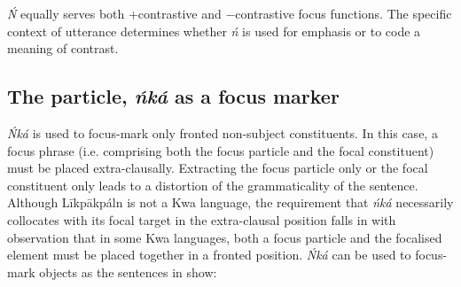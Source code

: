 \documentclass[output=paper,colorlinks,citecolor=brown]{langscibook}
\begin{document}
\ea%
    \label{ex:bisilki:12}
    \z
\z

\textit{Ń} equally serves both +contrastive and −contrastive focus functions. The specific context of utterance determines whether \textit{ń} is used for emphasis or to code a meaning of contrast.

\subsection{The particle, \textit{ńká} as a focus marker}\label{sec:bisilki:5.2}

\textit{Ńká} is used to focus-mark only fronted non-subject constituents. In this case, a focus phrase (i.e. comprising both the focus particle and the focal constituent) must be placed extra-clausally. Extracting the focus particle only or the focal constituent only leads to a distortion of the grammaticality of the sentence. Although Līkpākpáln is not a Kwa language, the requirement that \textit{ńká }necessarily collocates with its focal target in the extra-clausal position falls in with  observation that in some Kwa languages, both a focus particle and the focalised element must be placed together in a fronted position. \textit{Ńká} can be used to focus-mark objects as the sentences in  show:
\end{document}
